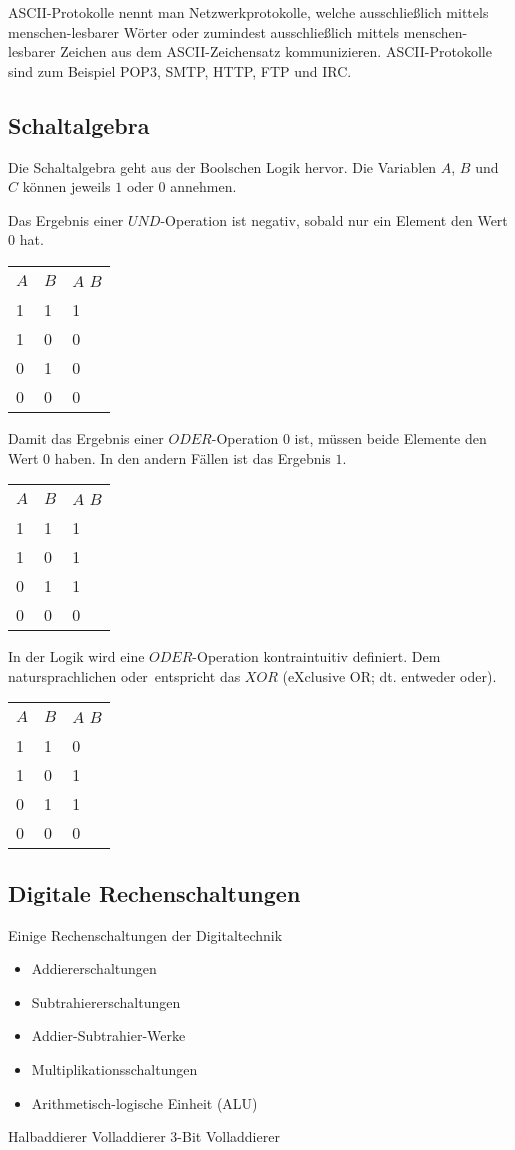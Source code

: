 ASCII-Protokolle nennt man Netzwerkprotokolle, welche ausschließlich mittels menschen-lesbarer Wörter oder zumindest ausschließlich mittels menschen-lesbarer Zeichen aus dem ASCII-Zeichensatz kommunizieren. ASCII-Protokolle sind zum Beispiel POP3, SMTP, HTTP, FTP und IRC.

\subsection{Schaltalgebra}
Die Schaltalgebra geht aus der Boolschen Logik hervor. Die Variablen $A$, $B$ und $C$ können jeweils $1$ oder $0$ annehmen.

Das Ergebnis einer $UND$-Operation ist negativ, sobald nur ein Element den Wert $0$ hat.
\begin{tabular}{l|l|l}
	$A$	& $B$	& {$A$ \wedge $B$}\\
	1	& 1		& 1 \\
	1	& 0		& 0 \\
	0	& 1		& 0 \\
	0	& 0		& 0 \\
\end{tabular}

Damit das Ergebnis einer $ODER$-Operation $0$ ist, müssen beide Elemente den Wert $0$ haben. In den andern Fällen ist das Ergebnis $1$.
\begin{tabular}{l|l|l}
	$A$	& $B$	& {$A$ \vee $B$}\\
	1	& 1		& 1 \\
	1	& 0		& 1 \\
	0	& 1		& 1 \\
	0	& 0		& 0 \\
\end{tabular}

In der Logik wird eine $ODER$-Operation kontraintuitiv definiert. Dem natursprachlichen \ql oder\qr\ entspricht das $XOR$ (eXclusive OR; dt. entweder oder).
\begin{tabular}{l|l|l}
	$A$	& $B$	& {$A$ \veebar $B$}\\
	1	& 1		& 0 \\
	1	& 0		& 1 \\
	0	& 1		& 1 \\
	0	& 0		& 0 \\
\end{tabular}

\subsection{Digitale Rechenschaltungen}

Einige Rechenschaltungen der Digitaltechnik
\begin{itemize}
	\item Addiererschaltungen
	\item Subtrahiererschaltungen
	\item Addier-Subtrahier-Werke
	\item Multiplikationsschaltungen
	\item Arithmetisch-logische Einheit (ALU)
\end{itemize}

Halbaddierer
Volladdierer
3-Bit Volladdierer



